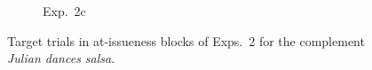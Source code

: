 \documentclass[11pt,fleqn]{article}
\newcommand{\6}{\mbox{$[\hspace*{-.6mm}[$}}
\newcommand{\9}{\mbox{$]\hspace*{-.6mm}]$}}
\begin{document}
\begin{figure}[h!]
 \begin{subfigure}[t]{0.5\textwidth}
        \centering
{}
\caption{Exp.~2c}
 \end{subfigure}

\caption{Target trials in at-issueness blocks of Exps.~2 for the complement {\em Julian dances salsa}.}\label{fig:ai-exps2}
\end{figure}
\end{document}
